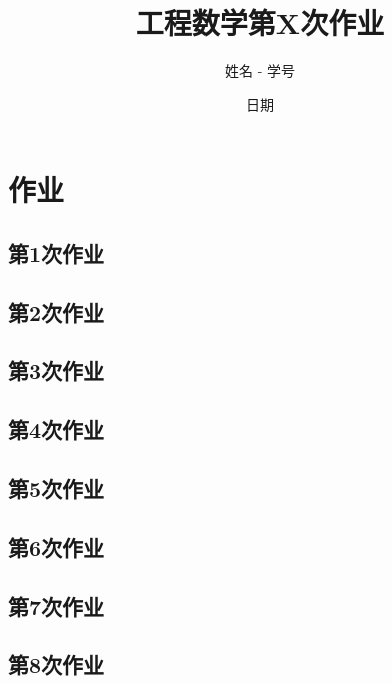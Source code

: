 \documentclass[a4paper, draft]{article}
\title{\vspace{-5cm}工程数学第X次作业}
\author{姓名 - 学号}
\date{日期}
\begin{document}
\maketitle

\section{作业}

\subsection{第1次作业}



\subsection{第2次作业}



\subsection{第3次作业}



\subsection{第4次作业}



\subsection{第5次作业}



\subsection{第6次作业}



\subsection{第7次作业}



\subsection{第8次作业}
\end{document}
